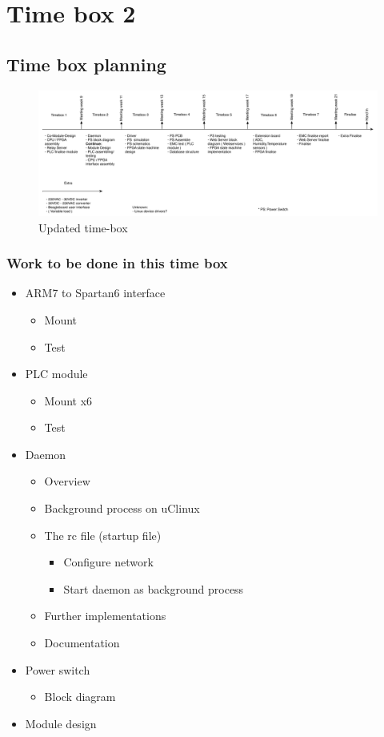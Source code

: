\section{Time box 2}
\subsection{Time box planning}

\begin{figure}[H]
	\begin{centering}
		 \includegraphics[width=1.0\textwidth]{content/appendix/eudp/images/tb_r2.pdf}
		\caption{Updated time-box}
	\end{centering}
\end{figure}

\subsubsection{Work to be done in this time box}
\begin{itemize}
	\item ARM7 to Spartan6 interface
	\begin{itemize}
		\item Mount
		\item Test
	\end{itemize}
	\item PLC module
	\begin{itemize}
		\item Mount x6
		\item Test
	\end{itemize}
	\item Daemon
	\begin{itemize}
		\item Overview
		\item Background process on uClinux
		\item The rc file (startup file)
		\begin{itemize}
			\item Configure network
			\item Start daemon as background process
		\end{itemize}
		\item Further implementations
		\item Documentation
	\end{itemize}
	\item Power switch
	\begin{itemize}
		\item Block diagram
	\end{itemize}
	\item Module design
\end{itemize}
